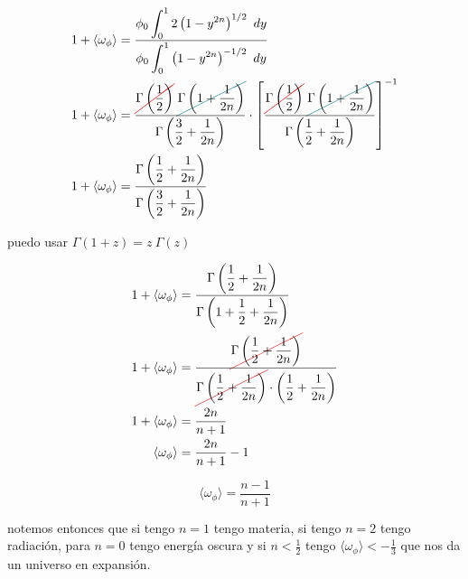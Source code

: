 \begin{equation*}
    \begin{split}
        1 + \langle \omega_\phi \rangle &= \frac{\displaystyle \phi_0 \int_0^1 2 \left( 1 - y^{2n} \right)^{1/2} \ dy}{\displaystyle \phi_0\int_0^1 \left( 1 - y^{2n} \right)^{-1/2} \ dy}\\
        1 + \langle \omega_\phi \rangle &= \frac{\displaystyle \colorcancel{red}{\Gamma \left( \frac{1}{2} \right)} \ \colorcancel{teal}{\Gamma \left( 1 + \frac{1}{2n} \right)}}{\displaystyle \Gamma \left( \frac{3}{2} + \frac{1}{2n} \right)} \cdot \left[ \frac{\displaystyle \colorcancel{red}{\Gamma \left( \frac{1}{2} \right)} \ \colorcancel{teal}{\Gamma \left( 1 + \frac{1}{2n} \right)}}{\displaystyle \Gamma \left( \frac{1}{2} + \frac{1}{2n} \right)} \right]^{-1}\\
        1 + \langle \omega_\phi \rangle &= \frac{\displaystyle \Gamma \left( \frac{1}{2} + \frac{1}{2n} \right)}{\displaystyle \Gamma \left( \frac{3}{2} + \frac{1}{2n} \right)}
    \end{split}
\end{equation*}

\noindent
puedo usar $\Gamma  (1 + z) = z \ \Gamma (z)$

\begin{equation*}
    \begin{split}
        1 + \langle \omega_\phi \rangle &= \frac{\displaystyle \Gamma \left( \frac{1}{2} + \frac{1}{2n} \right)}{\displaystyle \Gamma \left( 1 + \frac{1}{2} + \frac{1}{2n} \right)}\\
        1 + \langle \omega_\phi \rangle &= \frac{\displaystyle \colorcancel{red}{\Gamma \left( \frac{1}{2} + \frac{1}{2n} \right)}}{\displaystyle \colorcancel{red}{\Gamma \left( \frac{1}{2} + \frac{1}{2n} \right)} \cdot \left(\frac{1}{2} + \frac{1}{2n}\right)}\\
        1 + \langle \omega_\phi \rangle &= \frac{2n}{n + 1}\\
        \langle \omega_\phi \rangle &= \frac{2n}{n + 1} - 1
    \end{split}
\end{equation*}

\begin{equation}
    \langle \omega_\phi \rangle = \frac{n - 1}{n + 1}
\end{equation}

\noindent
notemos entonces que si tengo $n = 1$ tengo materia, si tengo $n = 2$ tengo radiación, para $n = 0$ tengo energía oscura y si $\displaystyle n < \frac{1}{2}$ tengo $\displaystyle \langle \omega_\phi \rangle < - \frac{1}{3}$ que nos da un universo en expansión.

